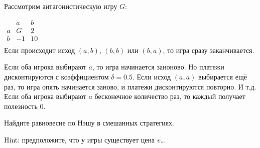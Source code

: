 \begin{problem}
Рассмотрим антагонистическую игру $G$:

$\begin{array}{|c|c|c|}
& a & b \\
a & G & 2 \\
b & -1 & 10 \\
\end{array}$ \\
Если происходит исход $(a,b)$, $(b,b)$ или $(b,a)$, то игра сразу заканчивается. \par
Если оба игрока выбирают $a$, то игра начинается заноново. Но платежи дисконтируются с коэффициентом $\delta=0.5$. Если исход $(a,a)$ выбирается ещё раз, то игра опять начинается заново, и платежи дисконтируются повторно. И т.д. Если оба игрока выбирают $a$ бесконечное количество раз, то каждый получает полезность 0. \par
Найдите равновесие по Нэшу в смешанных стратегиях. \par
Hint: предположите, что у игры существует цена $v$\ldots



\begin{sol}

\end{sol}
\end{problem}





